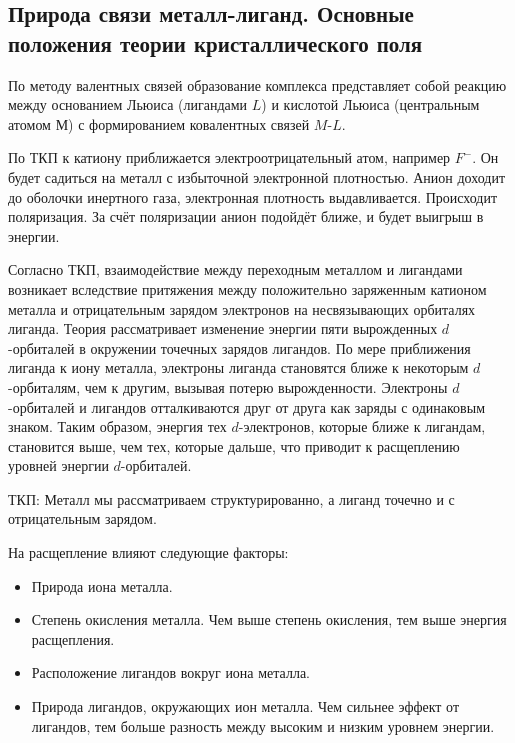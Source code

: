 \subsection{Природа связи металл-лиганд. Основные положения теории кристаллического поля}

По методу валентных связей образование комплекса представляет собой реакцию между основанием Льюиса (лигандами $L$) и кислотой Льюиса (центральным атомом $М$) с формированием ковалентных связей $M$-$L$.

По ТКП к катиону приближается электроотрицательный атом, например $F^-$. Он будет садиться на металл с избыточной электронной плотностью. Анион доходит до оболочки инертного газа, электронная плотность выдавливается. Происходит поляризация. За счёт поляризации анион подойдёт ближе, и будет выигрыш в энергии.

Согласно ТКП, взаимодействие между переходным металлом и лигандами возникает вследствие притяжения между положительно заряженным катионом металла и отрицательным зарядом электронов на несвязывающих орбиталях лиганда. Теория рассматривает изменение энергии пяти вырожденных $d$-орбиталей в окружении точечных зарядов лигандов. По мере приближения лиганда к иону металла, электроны лиганда становятся ближе к некоторым $d$-орбиталям, чем к другим, вызывая потерю вырожденности. Электроны $d$-орбиталей и лигандов отталкиваются друг от друга как заряды с одинаковым знаком. Таким образом, энергия тех $d$-электронов, которые ближе к лигандам, становится выше, чем тех, которые дальше, что приводит к расщеплению уровней энергии $d$-орбиталей.

ТКП: Металл мы рассматриваем структурированно, а лиганд точечно и с отрицательным зарядом.

На расщепление влияют следующие факторы:
\begin{itemize}
\item Природа иона металла.

\item Степень окисления металла. Чем выше степень окисления, тем выше энергия расщепления.

\item Расположение лигандов вокруг иона металла.

\item Природа лигандов, окружающих ион металла. Чем сильнее эффект от лигандов, тем больше разность между высоким и низким уровнем энергии.
\end{itemize}